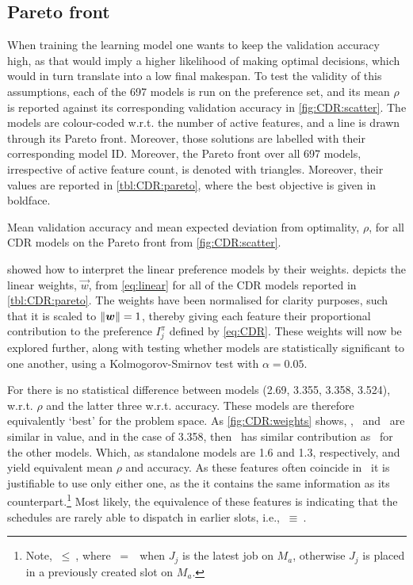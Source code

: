 \documentclass[smallextended]{svjour3}
\begin{document}
\subsection{Pareto front}\label{sec:CDR:pareto}
When training the learning model one wants to keep the validation accuracy 
high, as that would imply a higher likelihood of making optimal decisions, 
which would in turn translate into a low final makespan. To test the validity 
of this assumptions, each of the 697 models is run on the preference set, and 
its mean $\rho$ is reported against its corresponding validation accuracy in 
\cref{fig:CDR:scatter}. The models are colour-coded w.r.t. the number of active 
features, and a line is drawn through its Pareto front. Moreover, those 
solutions are labelled with their corresponding model ID. Moreover, the Pareto 
front over all 697 models, irrespective of active feature count, is denoted 
with triangles. Moreover, their values are reported in \cref{tbl:CDR:pareto}, 
where the best objective is given in boldface. 

\begin{table}
    \caption{Mean validation accuracy and mean expected deviation from 
        optimality, $\rho$, for all CDR models on the Pareto front from 
        \cref{fig:CDR:scatter}.}\label{tbl:CDR:pareto}
    
\end{table}

 showed how to interpret the linear 
preference models by their weights. 
 depicts the linear weights, $\vec{w}$, from 
\cref{eq:linear} for all of the CDR models reported in \cref{tbl:CDR:pareto}. 
The weights have been normalised for clarity purposes, such that it is scaled 
to $\norm{\vec{w}}=1$, thereby giving each feature their proportional 
contribution to the preference $I_j^{\pi}$ defined by \cref{eq:CDR}. 
These weights will now be explored further, along with testing whether models 
are statistically significant to one another, using a 
Kolmogorov-Smirnov test with $\alpha=0.05$.

For   there is no statistical difference between models (2.69, 
3.355, 3.358, 3.524), w.r.t. $\rho$ and the latter three w.r.t. 
accuracy. These models are therefore equivalently `best' for the problem space.
As \cref{fig:CDR:weights} shows, \phiendTime, \phijobWrm\ and \phimacWrm\ are 
similar in value, and in the case of 3.358, then \phimacFree\ has similar 
contribution as \phiendTime\ for the other models. 
Which, as standalone models are 1.6 and 1.3, respectively, and yield 
equivalent mean $\rho$ and accuracy.
As these features often coincide in \jsp\, it is justifiable to use only 
either one, as the it contains the same information as its 
counterpart.\footnote{Note, \phiendTime$~\leq~$\phimacFree, where
    \phiendTime$~=~$\phimacFree\ when $J_j$ is the latest job on $M_a$, 
    otherwise $J_j$ is placed in a previously created slot on $M_a$.}
Most likely, the equivalence of these features is indicating that the 
schedules are rarely able to dispatch in earlier slots, i.e., 
\phiendTime$~\equiv~$\phimacFree. 
\end{document}
